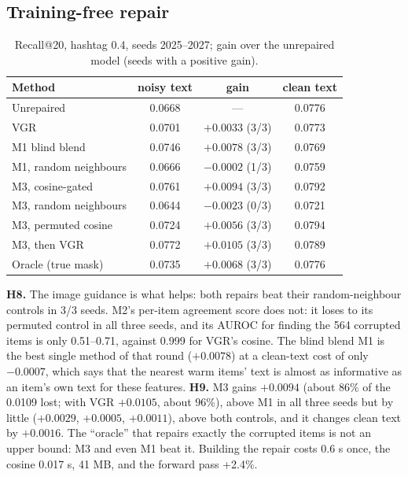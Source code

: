 \documentclass[conference]{IEEEtran}
\begin{document}
\subsection{Training-free repair}

\begin{table}[t]
\centering\caption{Recall@20, hashtag 0.4, seeds 2025--2027; gain over the unrepaired model (seeds with a positive gain).}
\label{tab:repair}
\small\setlength{\tabcolsep}{3pt}
\begin{tabular}{@{}>{\raggedright\arraybackslash}p{3.3cm}ccc@{}}
\hline
Method & noisy text & gain & clean text \\
\hline
Unrepaired & 0.0668 & --- & 0.0776 \\
VGR & 0.0701 & $+0.0033$ (3/3) & 0.0773 \\
M1 blind blend & 0.0746 & $+0.0078$ (3/3) & 0.0769 \\
M1, random neighbours & 0.0666 & $-0.0002$ (1/3) & 0.0759 \\
M3, cosine-gated & 0.0761 & $+0.0094$ (3/3) & 0.0792 \\
M3, random neighbours & 0.0644 & $-0.0023$ (0/3) & 0.0721 \\
M3, permuted cosine & 0.0724 & $+0.0056$ (3/3) & 0.0794 \\
M3, then VGR & 0.0772 & $+0.0105$ (3/3) & 0.0789 \\
Oracle (true mask) & 0.0735 & $+0.0068$ (3/3) & 0.0776 \\
\hline
\end{tabular}
\end{table}

\textbf{H8.} The image guidance is what helps: both repairs beat their random-neighbour controls in 3/3 seeds. M2's per-item agreement score does not: it loses to its permuted control in all three seeds, and its AUROC for finding the 564 corrupted items is only 0.51--0.71, against 0.999 for VGR's cosine. The blind blend M1 is the best single method of that round ($+0.0078$) at a clean-text cost of only $-0.0007$, which says that the nearest warm items' text is almost as informative as an item's own text for these features. \textbf{H9.} M3 gains $+0.0094$ (about 86\% of the 0.0109 lost; with VGR $+0.0105$, about 96\%), above M1 in all three seeds but by little ($+0.0029$, $+0.0005$, $+0.0011$), above both controls, and it changes clean text by $+0.0016$. The ``oracle'' that repairs exactly the corrupted items is not an upper bound: M3 and even M1 beat it. Building the repair costs 0.6 s once, the cosine 0.017 s, 41 MB, and the forward pass +2.4\%.
\end{document}
